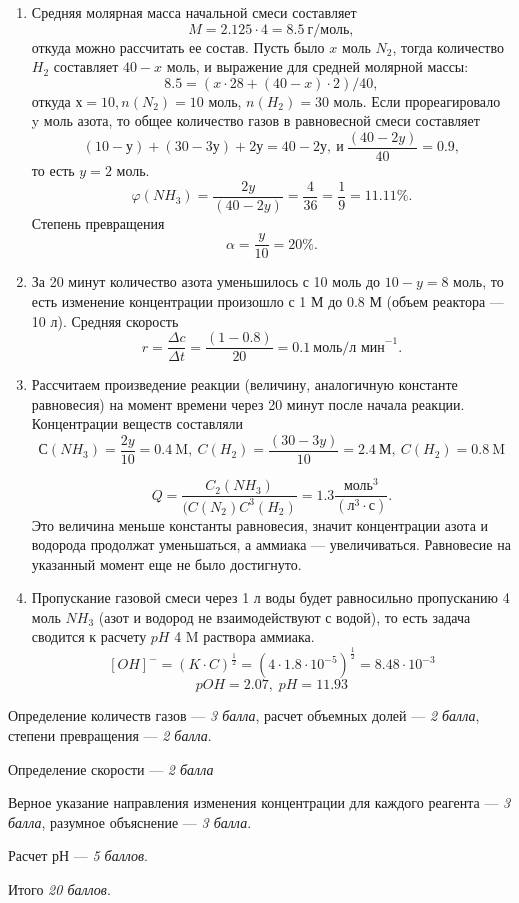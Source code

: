 \solutionSection

\begin{enumerate}
\item Средняя молярная масса начальной смеси составляет $$M = 2.125\cdot4 = 8.5 \: \text{г/моль},$$ 
откуда можно рассчитать ее состав. Пусть было $x$ моль $N_2$, тогда количество $H_2$ составляет $40-x$ моль, и выражение для средней молярной массы: 
$$8.5 = (x\cdot28 + (40-x)\cdot2)/40,$$ 
откуда $х = 10, n(N_2) = 10$ моль, $n(H_2) = 30$ моль. Если прореагировало y моль азота, то общее количество газов в равновесной смеси составляет 
$$(10 - у) + (30 - 3у) + 2у = 40-2у, \: \text{и}\: \frac{(40-2y)}{40} = 0.9,$$ то есть $y = 2$ моль. $$\varphi(NH_3) = \frac{2y}{(40-2y)} = \frac{4}{36} = \frac{1}{9} = 11.11\%.$$ 
Степень превращения $$\alpha = \frac{y}{10} = 20\%.$$
\item За 20 минут количество азота уменьшилось с 10 моль до $10 - y = 8$ моль, то есть изменение концентрации произошло с 1 М до 0.8 М (объем реактора — 10 л).
Средняя скорость $$r = \frac{\Delta c}{\Delta t} = \frac{(1-0.8)}{20} = 0.1 \: \text{моль/л мин}^{-1}.$$
\item Рассчитаем произведение реакции (величину, аналогичную константе равновесия) на момент времени через 20 минут после начала реакции. Концентрации веществ составляли 
$$С(NH_3) = \frac{2y}{10} = 0.4 \: \text{M}, \: C(H_2) = \frac{(30 - 3y)}{10} = 2.4 \: \text{М}, \: C(H_2) = 0.8 \: \text{M}$$

$$Q = \frac{C_2(NH_3)}{(C(N_2)C^3(H_2)} = 1.3\frac{\text{моль}^3}{(\text{л}^3\cdot\text{с})}.$$
Это величина меньше константы равновесия, значит концентрации азота и водорода продолжат уменьшаться, а аммиака — увеличиваться. Равновесие на указанный момент еще не было достигнуто. 
\item Пропускание газовой смеси через 1 л воды будет равносильно пропусканию 4 моль $NH_3$ (азот и водород не взаимодействуют с водой), то есть задача сводится к расчету $pH$ 4 M раствора аммиака. 
$$[OH]^-=(K\cdot C)^\frac{1}{2} = (4\cdot1.8\cdot10^{-5})^\frac{1}{2} = 8.48\cdot10^{-3}$$
$$pOH = 2.07,\;pH = 11.93$$
\end{enumerate}

\additionalCriteria

Определение количеств газов — \textit{3 балла}, расчет объемных долей — \textit{2 балла}, степени превращения — \textit{2 балла}.

Определение скорости — \textit{2 балла}

Верное указание направления изменения концентрации для каждого реагента — \textit{3 балла}, разумное объяснение — \textit{3 балла}.

Расчет $рН$ — \textit{5 баллов}.

Итого \textit{20 баллов}.